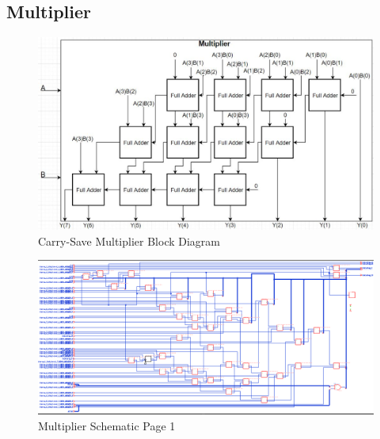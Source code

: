 \documentclass[11pt]{article}
\begin{document}
	\subsection{Multiplier}
	
		
		\begin{figure}[H]
			\centering
			\includegraphics[width=\textwidth,height=\dimexpr\textheight-4\baselineskip-\abovecaptionskip-\belowcaptionskip\relax,keepaspectratio]{Pictures/Multiplier}
			\caption{Carry-Save Multiplier Block Diagram}
			\label{fig:multiplier-block-dia}
		\end{figure}
	
	
		\begin{figure}[H] 
			\centering 
			\includegraphics[width=\textwidth,height=\dimexpr\textheight-4\baselineskip-\abovecaptionskip-\belowcaptionskip\relax,keepaspectratio]{"Pictures/Multiplier Schematic Page 1"}
			\caption{Multiplier Schematic Page 1} 
			\label{fig:Multiplier-Schematic-Page-1} 
		\end{figure}
		
\end{document}

